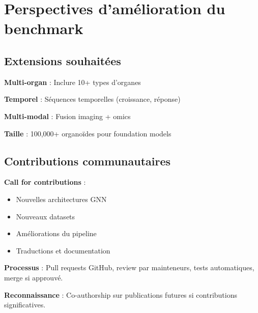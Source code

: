 \section{Perspectives d'amélioration du benchmark}

\subsection{Extensions souhaitées}

\textbf{Multi-organ} : Inclure 10+ types d'organes

\textbf{Temporel} : Séquences temporelles (croissance, réponse)

\textbf{Multi-modal} : Fusion imaging + omics

\textbf{Taille} : 100,000+ organoïdes pour foundation models

\subsection{Contributions communautaires}

\textbf{Call for contributions} :
\begin{itemize}
    \item Nouvelles architectures GNN
    \item Nouveaux datasets
    \item Améliorations du pipeline
    \item Traductions et documentation
\end{itemize}

\textbf{Processus} : Pull requests GitHub, review par mainteneurs, tests automatiques, merge si approuvé.

\textbf{Reconnaissance} : Co-authorship sur publications futures si contributions significatives.
